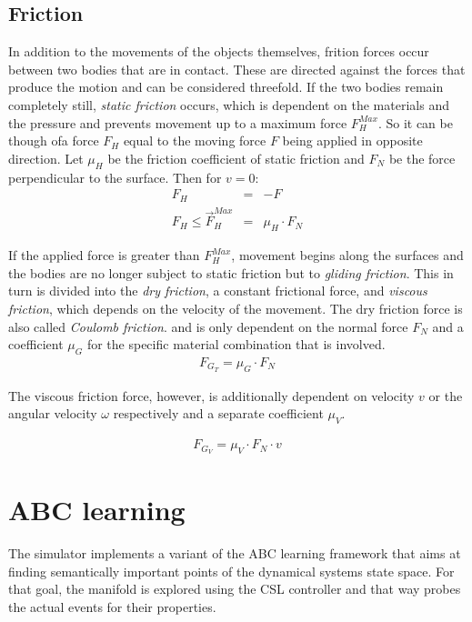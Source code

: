 \documentclass[10pt,a4paper]{article}
\begin{document}
\subsection{Friction}

In addition to the movements of the objects themselves, frition forces occur between two bodies that
are in contact. These are directed against the forces that produce the motion and can be considered
threefold.  If the two bodies remain completely still, \textit{static friction} occurs, which is
dependent on the materials and the pressure and prevents movement up to a maximum force $F_H^{Max}$.
So it can be though ofa force $F_H$ equal to the moving force $F$ being applied in opposite
direction.  Let $\mu_H$ be the friction coefficient of static friction and $F_N$ be the force
perpendicular to the surface. Then for $v = 0$:
\begin{eqnarray}
    F_H & = & -F \\
    F_H \le \vec F_H^{Max} & = & \mu_H \cdot F_N
\end{eqnarray}

If the applied force is greater than $F_H^{Max}$, movement begins along the surfaces and the bodies
are no longer subject to static friction but to \textit{gliding friction}.
This in turn is divided into the \textit {dry friction}, a constant frictional force,
and \textit{viscous friction}, which depends on the velocity of the movement.
The dry friction force is also called \textit{Coulomb friction}.
and is only dependent on the normal force $F_N$ and a coefficient $\mu_G$ for the
specific material combination that is involved.
\begin{eqnarray}
    F_{G_T} = \mu_G \cdot F_N
\end{eqnarray}

The viscous friction force, however, is additionally dependent on velocity $v$ or the
angular velocity $\omega$ respectively and a separate coefficient $\mu_V$.

\begin{eqnarray}
    F_{G_V} = \mu_V \cdot F_N \cdot v
\end{eqnarray}

\section{ABC learning}
    The simulator implements a variant of the ABC learning framework that aims at finding
    semantically important points of the dynamical systems state space.
    For that goal, the manifold is explored using the CSL controller and that way probes the
    actual events for their properties.
\end{document}
